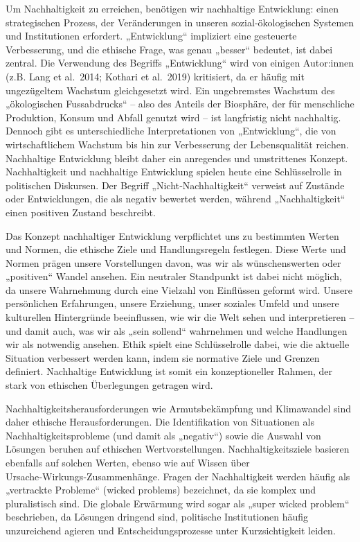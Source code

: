 \documentclass[
  letterpaper,
  DIV=11,
  numbers=noendperiod]{scrartcl}
\begin{document}
Um Nachhaltigkeit zu erreichen, benötigen wir nachhaltige Entwicklung:
einen strategischen Prozess, der Veränderungen in unseren
sozial‑ökologischen Systemen und Institutionen erfordert. „Entwicklung``
impliziert eine gesteuerte Verbesserung, und die ethische Frage, was
genau „besser`` bedeutet, ist dabei zentral. Die Verwendung des Begriffs
„Entwicklung`` wird von einigen Autor:innen (z.B. Lang et al.~2014;
Kothari et al.~2019) kritisiert, da er häufig mit ungezügeltem Wachstum
gleichgesetzt wird. Ein ungebremstes Wachstum des „ökologischen
Fussabdrucks`` -- also des Anteils der Biosphäre, der für menschliche
Produktion, Konsum und Abfall genutzt wird -- ist langfristig nicht
nachhaltig. Dennoch gibt es unterschiedliche Interpretationen von
„Entwicklung``, die von wirtschaftlichem Wachstum bis hin zur
Verbesserung der Lebensqualität reichen. Nachhaltige Entwicklung bleibt
daher ein anregendes und umstrittenes Konzept. Nachhaltigkeit und
nachhaltige Entwicklung spielen heute eine Schlüsselrolle in politischen
Diskursen. Der Begriff „Nicht‑Nachhaltigkeit`` verweist auf Zustände
oder Entwicklungen, die als negativ bewertet werden, während
„Nachhaltigkeit`` einen positiven Zustand beschreibt.

Das Konzept nachhaltiger Entwicklung verpflichtet uns zu bestimmten
Werten und Normen, die ethische Ziele und Handlungsregeln festlegen.
Diese Werte und Normen prägen unsere Vorstellungen davon, was wir als
wünschenswerten oder „positiven`` Wandel ansehen. Ein neutraler
Standpunkt ist dabei nicht möglich, da unsere Wahrnehmung durch eine
Vielzahl von Einflüssen geformt wird. Unsere persönlichen Erfahrungen,
unsere Erziehung, unser soziales Umfeld und unsere kulturellen
Hintergründe beeinflussen, wie wir die Welt sehen und interpretieren --
und damit auch, was wir als „sein sollend`` wahrnehmen und welche
Handlungen wir als notwendig ansehen. Ethik spielt eine Schlüsselrolle
dabei, wie die aktuelle Situation verbessert werden kann, indem sie
normative Ziele und Grenzen definiert. Nachhaltige Entwicklung ist somit
ein konzeptioneller Rahmen, der stark von ethischen Überlegungen
getragen wird.

Nachhaltigkeitsherausforderungen wie Armutsbekämpfung und Klimawandel
sind daher ethische Herausforderungen. Die Identifikation von
Situationen als Nachhaltigkeitsprobleme (und damit als „negativ``) sowie
die Auswahl von Lösungen beruhen auf ethischen Wertvorstellungen.
Nachhaltigkeitsziele basieren ebenfalls auf solchen Werten, ebenso wie
auf Wissen über Ursache‑Wirkungs‑Zusammenhänge. Fragen der
Nachhaltigkeit werden häufig als „vertrackte Probleme`` (wicked
problems) bezeichnet, da sie komplex und pluralistisch sind. Die globale
Erwärmung wird sogar als „super wicked problem`` beschrieben, da
Lösungen dringend sind, politische Institutionen häufig unzureichend
agieren und Entscheidungsprozesse unter Kurzsichtigkeit leiden.
\end{document}
